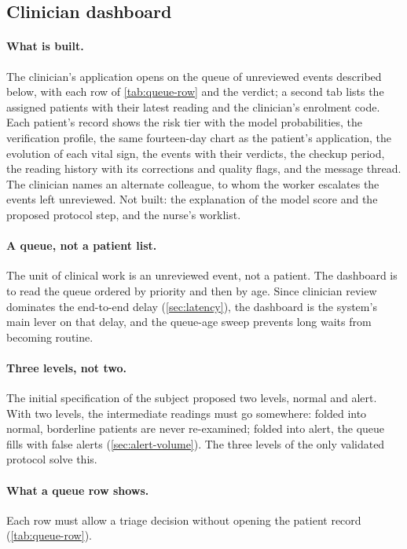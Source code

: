 \subsection{Clinician dashboard}\label{sec:dashboard}\label{sec:queue-view}\label{sec:three-tiers}\label{sec:queue-row}\label{sec:never-display}\label{sec:verdict-capture}\label{sec:dash-roles}\label{sec:replace-task}

\paragraph{What is built.} The clinician's application opens on the queue of unreviewed events described below, with each row of \cref{tab:queue-row} and the verdict; a second tab lists the assigned patients with their latest reading and the clinician's enrolment code. Each patient's record shows the risk tier with the model probabilities, the verification profile, the same fourteen-day chart as the patient's application, the evolution of each vital sign, the events with their verdicts, the checkup period, the reading history with its corrections and quality flags, and the message thread. The clinician names an alternate colleague, to whom the worker escalates the events left unreviewed. Not built: the explanation of the model score and the proposed protocol step, and the nurse's worklist.

\paragraph{A queue, not a patient list.} The unit of clinical work is an unreviewed event, not a patient. The dashboard is to read the queue ordered by priority and then by age. Since clinician review dominates the end-to-end delay (\cref{sec:latency}), the dashboard is the system's main lever on that delay, and the queue-age sweep prevents long waits from becoming routine.

\paragraph{Three levels, not two.} The initial specification of the subject proposed two levels, normal and alert. With two levels, the intermediate readings must go somewhere: folded into normal, borderline patients are never re-examined; folded into alert, the queue fills with false alerts (\cref{sec:alert-volume}). The three levels of the only validated protocol solve this.

\paragraph{What a queue row shows.} Each row must allow a triage decision without opening the patient record (\cref{tab:queue-row}).

